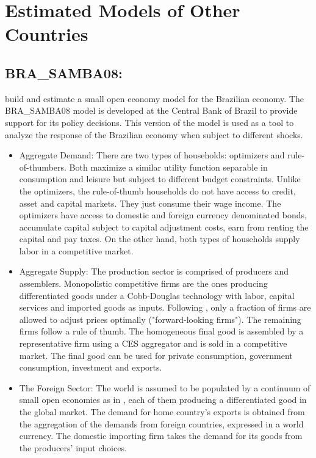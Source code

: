 \documentclass[11pt,a4paper]{article}
\begin{document}
	\section{Estimated Models of Other Countries}
	\subsection{BRA\_SAMBA08: \cite{Gouveaetal2008}}
	\label{BRASAMBA08}
	\cite{Gouveaetal2008} build and estimate a small open economy model for the Brazilian economy. The BRA\_SAMBA08 model is developed at the Central Bank of Brazil to provide support for its policy decisions. This version of the model is used as a tool to analyze the response of the Brazilian economy when subject to different shocks.
	
	\begin{itemize}
		
		\item Aggregate Demand: There are two types of households: optimizers and rule-of-thumbers. Both maximize a similar utility function separable in consumption and leisure but subject to different budget constraints. Unlike the optimizers, the rule-of-thumb households do not have access to credit, asset and capital markets. They just consume their wage income. The optimizers have access to domestic and foreign currency denominated bonds, accumulate capital subject to capital adjustment costs, earn from renting the capital and pay taxes. On the other hand, both types of households supply labor in a competitive market.
		
		\item Aggregate Supply: The production sector is comprised of producers and assemblers. Monopolistic competitive firms are the ones producing differentiated goods under a Cobb-Douglas technology with labor, capital services and imported goods as inputs. Following \cite{GaliGertler1999}, only a fraction of firms are allowed to adjust prices optimally ("forward-looking firms"). The remaining firms follow a rule of thumb. The homogeneous final good is assembled by a representative firm using a CES aggregator and is sold in a competitive market. The final good can be used for private consumption, government consumption, investment and exports.
		
		\item The Foreign Sector: The world is assumed to be populated by a continuum of small open economies as in \cite{GaliMonacelli2005}, each of them producing a differentiated good in the global market. The demand for home country's exports is obtained from the aggregation of the demands from foreign countries, expressed in a world currency. The domestic importing firm takes the demand for its goods from the producers' input choices.
		

\end{itemize}
\end{document}
